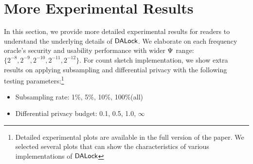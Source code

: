 \vspace{-0.1in}
\section{More Experimental Results}\label{appendix:experimentalResults}
In this section, we provide more detailed experimental results for readers to understand the underlying details of $\mathsf{DALock}$. We elaborate on each frequency oracle's security and usability performance with wider $\Psi$ range: $\{2^{-8}, 2^{-9},2^{-10},2^{-11}, 2^{-12}\}$. For count sketch implementation, we show extra results on applying subsampling and differential privacy with the following testing parameters:\footnote{Detailed experimental plots are available in the full version of the paper. We selected several plots that can show the characteristics of various implementations of $\mathsf{DALock}$}
\begin{itemize}
	\item Subsampling rate: 1\%, 5\%, 10\%, 100\%(all)
	\item Differential privacy budget: 0.1, 0.5, 1.0, $\infty$
\end{itemize}

